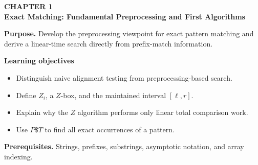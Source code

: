 \documentclass[11pt]{article}
\begin{document}
\begin{tcolorbox}[
  enhanced,breakable,colback=Primary!4,colframe=Primary,boxrule=0.9pt,
  arc=2mm,left=3mm,right=3mm,top=2.5mm,bottom=2.5mm]
{\sffamily\color{Accent}\bfseries CHAPTER 1}\\[-1pt]
{\sffamily\LARGE\bfseries\color{Primary} Exact Matching: Fundamental Preprocessing and First Algorithms}

\vspace{2pt}
\textbf{Purpose.} Develop the preprocessing viewpoint for exact pattern matching and derive a linear-time search directly from prefix-match information.

\textbf{Learning objectives}
\begin{itemize}
  \item Distinguish naive alignment testing from preprocessing-based search.
  \item Define $Z_i$, a $Z$-box, and the maintained interval $[\ell,r]$.
  \item Explain why the $Z$ algorithm performs only linear total comparison work.
  \item Use $P\$T$ to find all exact occurrences of a pattern.
\end{itemize}

\textbf{Prerequisites.} Strings, prefixes, substrings, asymptotic notation, and array indexing.
\end{tcolorbox}
\end{document}

